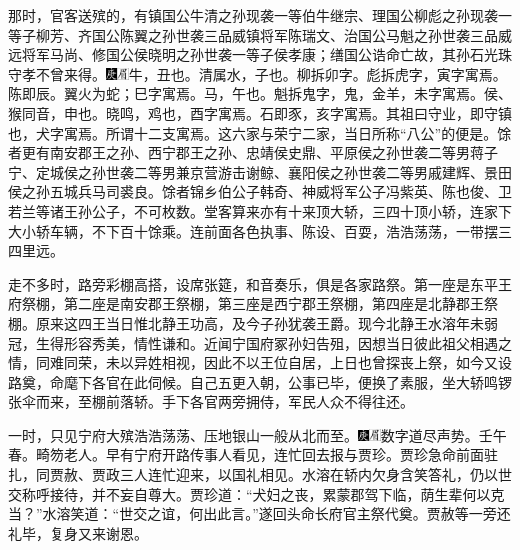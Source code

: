 那时，官客送殡的，有镇国公牛清之孙现袭一等伯牛继宗、理国公柳彪之孙现袭一等子柳芳、齐国公陈翼之孙世袭三品威镇将军陈瑞文、治国公马魁之孙世袭三品威远将军马尚、修国公侯晓明之孙世袭一等子侯孝康；缮国公诰命亡故，其孙石光珠守孝不曾来得。{\includegraphics[width=3mm]{../Images/00004}\includegraphics[width=3mm]{../Images/00010}\footnotesize \kaishu 牛，丑也。清属水，子也。柳拆卯字。彪拆虎字，寅字寓焉。陈即辰。翼火为蛇；巳字寓焉。马，午也。魁拆鬼字，鬼，金羊，未字寓焉。侯、猴同音，申也。晓鸣，鸡也，酉字寓焉。石即豕，亥字寓焉。其祖曰守业，即守镇也，犬字寓焉。所谓十二支寓焉。}这六家与荣宁二家，当日所称``八公''的便是。馀者更有南安郡王之孙、西宁郡王之孙、忠靖侯史鼎、平原侯之孙世袭二等男蒋子宁、定城侯之孙世袭二等男兼京营游击谢鲸、襄阳侯之孙世袭二等男戚建辉、景田侯之孙五城兵马司裘良。馀者锦乡伯公子韩奇、神威将军公子冯紫英、陈也俊、卫若兰等诸王孙公子，不可枚数。堂客算来亦有十来顶大轿，三四十顶小轿，连家下大小轿车辆，不下百十馀乘。连前面各色执事、陈设、百耍，浩浩荡荡，一带摆三四里远。

走不多时，路旁彩棚高搭，设席张筵，和音奏乐，俱是各家路祭。第一座是东平王府祭棚，第二座是南安郡王祭棚，第三座是西宁郡王祭棚，第四座是北静郡王祭棚。原来这四王当日惟北静王功高，及今子孙犹袭王爵。现今北静王水溶年未弱冠，生得形容秀美，情性谦和。近闻宁国府冢孙妇告殂，因想当日彼此祖父相遇之情，同难同荣，未以异姓相视，因此不以王位自居，上日也曾探丧上祭，如今又设路奠，命麾下各官在此伺候。自己五更入朝，公事已毕，便换了素服，坐大轿鸣锣张伞而来，至棚前落轿。手下各官两旁拥侍，军民人众不得往还。

一时，只见宁府大殡浩浩荡荡、压地银山一般从北而至。{\includegraphics[width=3mm]{../Images/00004}\includegraphics[width=3mm]{../Images/00010}\footnotesize \kaishu 数字道尽声势。壬午春。畸笏老人。}早有宁府开路传事人看见，连忙回去报与贾珍。贾珍急命前面驻扎，同贾赦、贾政三人连忙迎来，以国礼相见。水溶在轿内欠身含笑答礼，仍以世交称呼接待，并不妄自尊大。贾珍道：``犬妇之丧，累蒙郡驾下临，荫生辈何以克当？''水溶笑道：``世交之谊，何出此言。''遂回头命长府官主祭代奠。贾赦等一旁还礼毕，复身又来谢恩。

